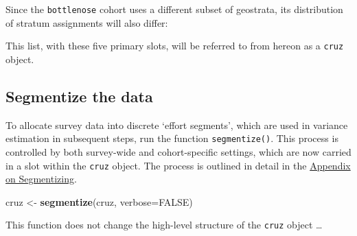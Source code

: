 \documentclass[
]{book}
\newenvironment{Shaded}{\begin{snugshade}}{\end{snugshade}}
\newcommand{\DataTypeTok}[1]{\textcolor[rgb]{0.13,0.29,0.53}{#1}}
\newcommand{\DecValTok}[1]{\textcolor[rgb]{0.00,0.00,0.81}{#1}}
\newcommand{\KeywordTok}[1]{\textcolor[rgb]{0.13,0.29,0.53}{\textbf{#1}}}
\newcommand{\NormalTok}[1]{#1}
\newcommand{\OperatorTok}[1]{\textcolor[rgb]{0.81,0.36,0.00}{\textbf{#1}}}
\newcommand{\OtherTok}[1]{\textcolor[rgb]{0.56,0.35,0.01}{#1}}
\newcommand{\StringTok}[1]{\textcolor[rgb]{0.31,0.60,0.02}{#1}}
\begin{document}
Since the \texttt{bottlenose} cohort uses a different subset of geostrata, its distribution of stratum assignments will also differ:

\begin{Shaded}
\end{Shaded}

This list, with these five primary slots, will be referred to from hereon as a \texttt{cruz} object.

\hypertarget{segmentize-the-data}{%
\subsection*{Segmentize the data}\label{segmentize-the-data}}

To allocate survey data into discrete `effort segments', which are used in variance estimation in subsequent steps, run the function \texttt{segmentize()}. This process is controlled by both survey-wide and cohort-specific \protect\hypertarget{settings}{}{settings}, which are now carried in a slot within the \texttt{cruz} object. The process is outlined in detail in the \protect\hyperlink{segmentizing}{Appendix on Segmentizing}.

\begin{Shaded}
\begin{Highlighting}[]
\NormalTok{cruz <-}\StringTok{ }\KeywordTok{segmentize}\NormalTok{(cruz, }\DataTypeTok{verbose=}\OtherTok{FALSE}\NormalTok{)}
\end{Highlighting}
\end{Shaded}

This function does not change the high-level structure of the \texttt{cruz} object \ldots{}

\begin{Shaded}
\end{Shaded}
\end{document}

